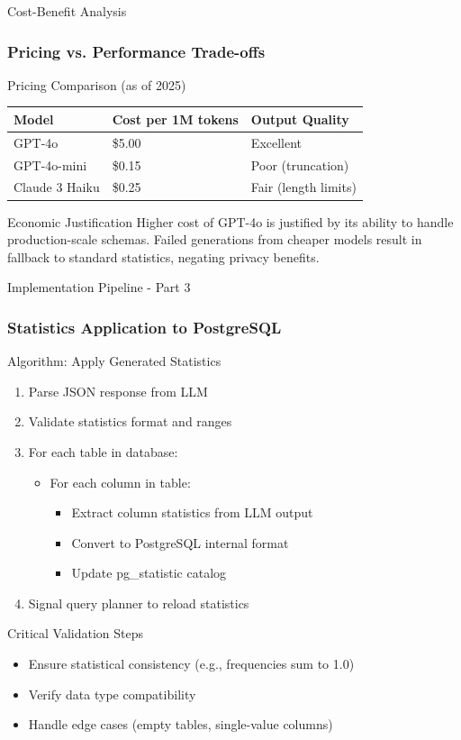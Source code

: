 \documentclass{beamer}
\begin{document}
\begin{frame}{Cost-Benefit Analysis}
\frametitle{Pricing vs. Performance Trade-offs}

\begin{exampleblock}{Pricing Comparison (as of 2025)}
\begin{tabular}{lll}
\toprule
Model & Cost per 1M tokens & Output Quality \\
\midrule
GPT-4o & \$5.00 & Excellent \\
GPT-4o-mini & \$0.15 & Poor (truncation) \\
Claude 3 Haiku & \$0.25 & Fair (length limits) \\
\bottomrule
\end{tabular}
\end{exampleblock}

\begin{alertblock}{Economic Justification}
Higher cost of GPT-4o is justified by its ability to handle production-scale schemas. Failed generations from cheaper models result in fallback to standard statistics, negating privacy benefits.
\end{alertblock}

\end{frame}

\begin{frame}{Implementation Pipeline - Part 3}
\frametitle{Statistics Application to PostgreSQL}

\begin{block}{Algorithm: Apply Generated Statistics}
\begin{enumerate}
\item Parse JSON response from LLM
\item Validate statistics format and ranges
\item For each table in database:
    \begin{itemize}
    \item For each column in table:
        \begin{itemize}
        \item Extract column statistics from LLM output
        \item Convert to PostgreSQL internal format
        \item Update pg\_statistic catalog
        \end{itemize}
    \end{itemize}
\item Signal query planner to reload statistics
\end{enumerate}
\end{block}

\begin{alertblock}{Critical Validation Steps}
\begin{itemize}
    \item Ensure statistical consistency (e.g., frequencies sum to 1.0)
    \item Verify data type compatibility
    \item Handle edge cases (empty tables, single-value columns)
\end{itemize}
\end{alertblock}

\end{frame}
\end{document}
